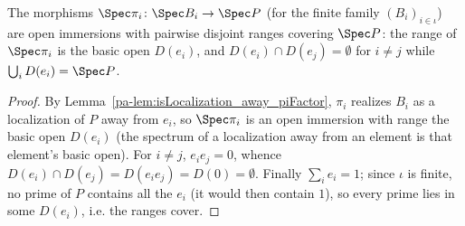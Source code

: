 \begin{lemma}
  \label{pa-lem:opensRange_eval_clopen}
  \leanok

  The morphisms \(\Spec \pi_i \colon \Spec B_i \to \Spec P\) (for the finite family
  \((B_i)_{i \in \iota}\)) are open immersions with pairwise disjoint ranges covering \(\Spec P\):
  the range of \(\Spec \pi_i\) is the basic open \(D(e_i)\), and \(D(e_i) \cap D(e_j) = \emptyset\)
  for \(i \ne j\) while \(\bigcup_i D(e_i) = \Spec P\).
\end{lemma}
\begin{proof}
  \leanok
  By Lemma~\ref{pa-lem:isLocalization_away_piFactor}, \(\pi_i\) realizes \(B_i\) as a localization of
  \(P\) away from \(e_i\), so \(\Spec \pi_i\) is an open immersion with range the basic open
  \(D(e_i)\) (the spectrum of a localization away from an element is that element's basic open). For
  \(i \ne j\), \(e_i e_j = 0\), whence \(D(e_i) \cap D(e_j) = D(e_i e_j) = D(0) = \emptyset\).
  Finally \(\sum_i e_i = 1\); since \(\iota\) is finite, no prime of \(P\) contains all the \(e_i\)
  (it would then contain \(1\)), so every prime lies in some \(D(e_i)\), i.e. the ranges cover.
\end{proof}


